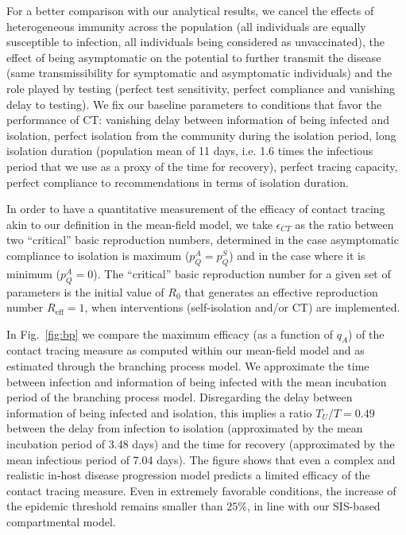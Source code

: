 \documentclass[aps,twocolumn,superscriptaddress,nofootinbib,pre,floatfix]{revtex4-1}
\begin{document}
For a better comparison with our analytical results, we cancel the
effects of heterogeneous immunity across the population (all
individuals are equally susceptible to infection, all individuals
being considered as unvaccinated), the effect of being asymptomatic on
the potential to further transmit the disease (same transmissibility
for symptomatic and asymptomatic individuals) and the role played by
testing (perfect test sensitivity, perfect compliance and vanishing
delay to testing).  We fix our baseline parameters to conditions that
favor the performance of CT: vanishing delay between information of
being infected and isolation, perfect isolation from the community
during the isolation period, long isolation duration (population mean
of 11 days, i.e. 1.6 times the infectious period that we use as a
proxy of the time for recovery), perfect tracing capacity, perfect
compliance to recommendations in terms of isolation duration.

In order to have a quantitative measurement of the efficacy of contact
tracing akin to our definition in the mean-field
model, we take $\epsilon_{CT}$ as the ratio between two
``critical'' basic reproduction numbers, determined in the case
asymptomatic compliance to isolation is maximum ($p_Q^A = p_Q^S$)
and in the case where it is minimum ($p_Q^A = 0$). 
The ``critical'' basic reproduction number for a given set of parameters
is the initial value of $R_0$ that
generates an effective reproduction number $R_{\textrm{eff}} =1$,
when interventions (self-isolation and/or CT) are implemented.

In Fig.~\ref{fig:bp} we compare the maximum efficacy (as a function of
$q_A$) of the contact tracing measure as computed within our
mean-field model and as estimated through the branching process model.
We approximate the time between infection and information of being
infected with the mean incubation period of the branching process
model. Disregarding the delay between information of being infected
and isolation, this implies a ratio $T_U/T = 0.49$ between the delay
from infection to isolation (approximated by the mean incubation
period of 3.48 days) and the time for recovery (approximated by the
mean infectious period of 7.04 days).  The figure shows that even a
complex and realistic in-host disease progression model predicts a
limited efficacy of the contact tracing measure. Even in extremely
favorable conditions, the increase of the epidemic threshold remains
smaller than $25\%$, in line with our SIS-based compartmental model.
\end{document}
